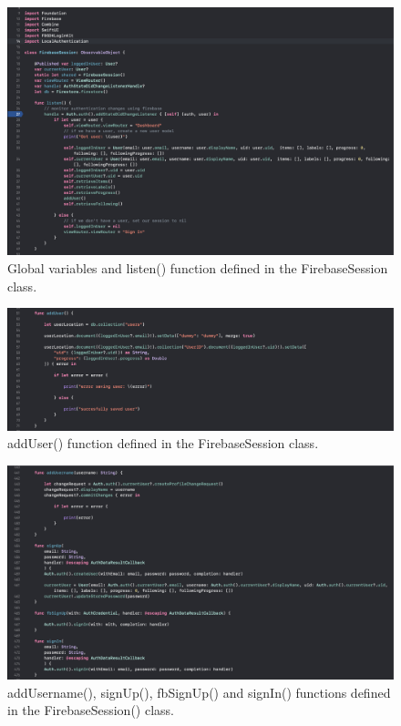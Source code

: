 \begin{figure}[H]
    \centering
    \includegraphics[width=\textwidth]{./graphics/Implementation/Splash_Sign_Up_Sign_In/firebasesession1.png}
    \caption{Global variables and listen() function defined in the FirebaseSession class.}
    \label{fig:firebasesession1}
\end{figure}

\begin{figure}[H]
    \centering
    \includegraphics[width=\textwidth]{./graphics/Implementation/Splash_Sign_Up_Sign_In/firebasesession2.png}
    \caption{addUser() function defined in the FirebaseSession class.}
    \label{fig:firebasesession2}
\end{figure}

\begin{figure}[H]
    \centering
    \includegraphics[width=\textwidth]{./graphics/Implementation/Splash_Sign_Up_Sign_In/firebasesession3.png}
    \caption{addUsername(), signUp(), fbSignUp() and signIn() functions defined in the FirebaseSession() class.}
    \label{fig:firebasesession3}
\end{figure}

